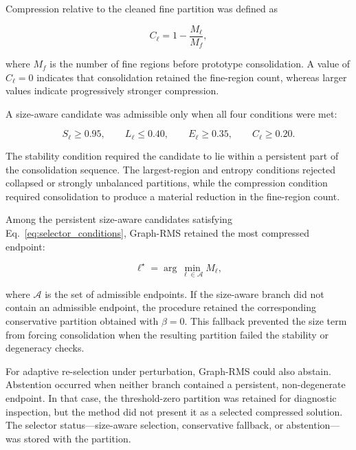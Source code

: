 \documentclass[10pt,a4paper,fleqn]{article}
\begin{document}
Compression relative to the cleaned fine partition was defined as

\begin{equation}
C_{\ell}
=
1-
\frac{M_{\ell}}{M_f},
\label{eq:selector_compression}
\end{equation}

where \(M_f\) is the number of fine regions before prototype consolidation.
A value of \(C_{\ell}=0\) indicates that consolidation retained the fine-region
count, whereas larger values indicate progressively stronger compression.

A size-aware candidate was admissible only when all four conditions were met:

\begin{equation}
S_{\ell}\geq0.95,
\qquad
L_{\ell}\leq0.40,
\qquad
E_{\ell}\geq0.35,
\qquad
C_{\ell}\geq0.20.
\label{eq:selector_conditions}
\end{equation}

The stability condition required the candidate to lie within a persistent part
of the consolidation sequence. The largest-region and entropy conditions
rejected collapsed or strongly unbalanced partitions, while the compression
condition required consolidation to produce a material reduction in the
fine-region count.

Among the persistent size-aware candidates satisfying
Eq.~\eqref{eq:selector_conditions}, Graph-RMS retained the most compressed
endpoint:

\begin{equation}
\ell^{\star}
=
\arg\min_{\ell\in\mathcal{A}}
M_{\ell},
\label{eq:selected_endpoint}
\end{equation}

where \(\mathcal{A}\) is the set of admissible endpoints. If the size-aware
branch did not contain an admissible endpoint, the procedure retained the
corresponding conservative partition obtained with \(\beta=0\). This fallback
prevented the size term from forcing consolidation when the resulting
partition failed the stability or degeneracy checks.

For adaptive re-selection under perturbation, Graph-RMS could also abstain.
Abstention occurred when neither branch contained a persistent,
non-degenerate endpoint. In that case, the threshold-zero partition was
retained for diagnostic inspection, but the method did not present it as a
selected compressed solution. The selector status---size-aware selection,
conservative fallback, or abstention---was stored with the partition.
\end{document}
